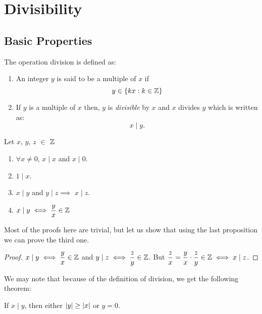 \chapter{Divisibility}

\section{Basic Properties}

\begin{definition}
	[Division]
	The operation division is defined as:
	\begin{enumerate}
		\item An integer \(y\) is said to be a multiple of \(x\) if \[y\in \{kx : k\in \mathbb Z \} \]
		\item If \(y\) is a multiple of \(x\) then, \(y\) is \textit{divisible} by \(x\) and \(x\) divides \(y\) which is written as: \[x \mid y.\]
	\end{enumerate}
\end{definition}

\begin{proposition}
	Let \(x\), \(y\), \(z\) \(\in\) \(\mathbb Z\)
	\begin{enumerate}
		\item \(\forall x \ne 0\), \(x \mid x\) and \(x \mid 0\).
		\item \(1 \mid x\).
		\item \(x\mid y\) and \(y \mid z \implies \) \(x \mid z\).
		\item \(x \mid y \iff \dfrac{y}{x} \in \mathbb Z\)
	\end{enumerate}
	
	
\end{proposition}

Most of the proofs here are trivial, but let us show that using the last proposition we can prove the third one.

\begin{proof}
	\( x \mid y \iff \dfrac{y}{x} \in \mathbb Z \) and \(  y \mid z \iff \dfrac{z}{y} \in \mathbb Z \). But \( \dfrac{z}{x}= \dfrac{y}{x}\cdot\dfrac{z}{y} \in \mathbb Z \iff x\mid z\).
\end{proof}


We may note that because of the definition of division, we get the following theorem:

\begin{theorem}
	If \(x \mid y\), then either \(\abs{y} \ge \abs{x} \) or \(y=0\).
\end{theorem}

